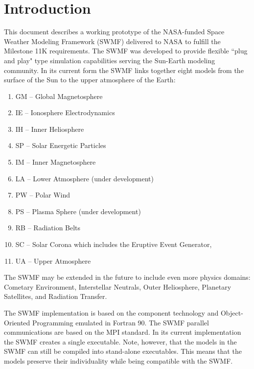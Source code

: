 


\chapter{Introduction}

This document describes a working prototype of the NASA-funded Space
Weather Modeling Framework (SWMF) delivered to NASA to fulfill the
Milestone 11K requirements. The SWMF was developed to provide flexible
``plug and play" type simulation capabilities serving the Sun-Earth
modeling community.  In its current form the SWMF links together eight
models from the surface of the Sun to the upper atmosphere of the Earth: 
\begin{enumerate}
\item GM -- Global Magnetosphere 
\item IE -- Ionosphere Electrodynamics
\item IH -- Inner Heliosphere
\item SP -- Solar Energetic Particles 
\item IM -- Inner Magnetosphere
\item LA -- Lower Atmosphere (under development)
\item PW -- Polar Wind
\item PS -- Plasma Sphere (under development)
\item RB -- Radiation Belts
\item SC -- Solar Corona which includes the Eruptive Event Generator,
\item UA -- Upper Atmosphere
\end{enumerate}
The SWMF may be extended in the future to include even more 
physics domains: Cometary Environment, Interstellar
Neutrals, Outer Heliosphere, Planetary Satellites, and Radiation Transfer.

The SWMF implementation is based on the component technology and
Object-Oriented Programming emulated in Fortran 90.  The SWMF parallel
communications are based on the MPI standard.  In its current
implementation the SWMF creates a single executable. Note, however, that the
models in the SWMF can still be compiled into stand-alone executables.
This means that the models preserve their individuality while being
compatible with the SWMF.

